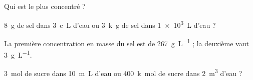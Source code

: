 \newpage






\hauteurLargeurCadreReponse		{7mm}{3cm}
\initialisationEntrainement

\debutEntrainement

Qui est le plus concentré ?


\begin{enonce}
\SI{8}{\gram} de sel dans \SI{3}{c\liter} d'eau ou \SI{3}{k\gram} de sel dans \SI{1e3}{\liter} d'eau ?
\end{enonce}


\begin{corrige}
La première concentration en masse du sel est de \SI{267}{\gram\per\liter} ; la deuxième vaut \SI{3}{\gram\per\liter}.
\end{corrige}



\begin{enonce}
\SI{3}{\mol} de sucre dans \SI{10}{m\liter} d'eau ou \SI{400}{k\mol} de sucre dans \SI{2}{\cubic\metre} d'eau ?
\end{enonce}

